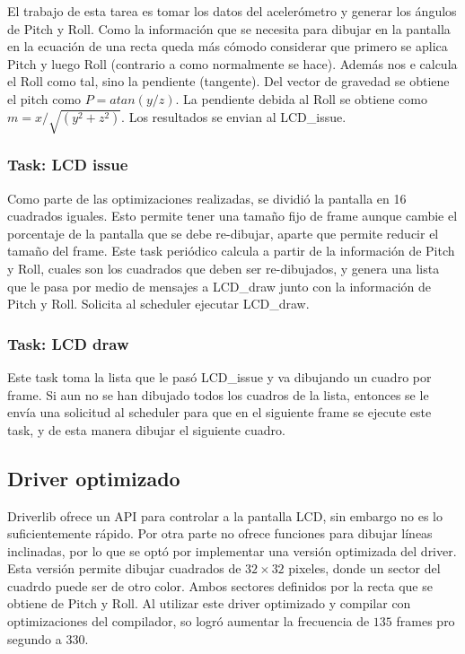 El trabajo de esta tarea es tomar los datos del acelerómetro y generar los ángulos de Pitch y
Roll. Como la información que se necesita para dibujar en la pantalla en la ecuación de una recta
queda más cómodo considerar que primero se aplica Pitch y luego Roll (contrario a como normalmente se
hace). Además nos e calcula el Roll como tal, sino la pendiente (tangente). Del vector de gravedad
se obtiene el pitch como $P = atan(y/z)$. La pendiente debida al Roll se obtiene como $m =
x/\sqrt{(y^2+z^2)}$. Los resultados se envian al LCD\_issue. 

\subsubsection{Task: LCD issue}
\label{sec:lcd_issue}

Como parte de las optimizaciones realizadas, se dividió la pantalla en 16 cuadrados iguales. Esto
permite tener una tamaño fijo de frame aunque cambie el porcentaje de la pantalla que se debe
re-dibujar, aparte que permite reducir el tamaño del frame. Este task periódico calcula a partir de
la información de Pitch y Roll, cuales son los cuadrados que deben ser re-dibujados, y genera una
lista que le pasa por medio de mensajes a LCD\_draw junto con la información de Pitch y
Roll. Solicita al scheduler ejecutar LCD\_draw.
\subsubsection{Task: LCD draw}
\label{sec:lcd_draw}
Este task toma la lista que le pasó LCD\_issue y va dibujando un cuadro por frame. Si aun no se han
dibujado todos los cuadros de la lista, entonces se le envía una solicitud al scheduler para que en el
siguiente frame se ejecute este task, y de esta manera dibujar el siguiente cuadro. 

\subsection{Driver optimizado}
Driverlib ofrece un API para controlar a la pantalla LCD, sin embargo no es lo suficientemente
rápido. Por otra parte no ofrece funciones para dibujar líneas inclinadas, por lo que se optó por
implementar una versión optimizada del driver. Esta versión permite dibujar cuadrados de $32\times
32$ pixeles, donde un sector del cuadrdo puede ser de otro color. Ambos sectores definidos por la
recta que se obtiene de Pitch y Roll. Al utilizar este driver optimizado y compilar con
optimizaciones del compilador, so logró aumentar la frecuencia de $135$ frames pro segundo a $330$.

